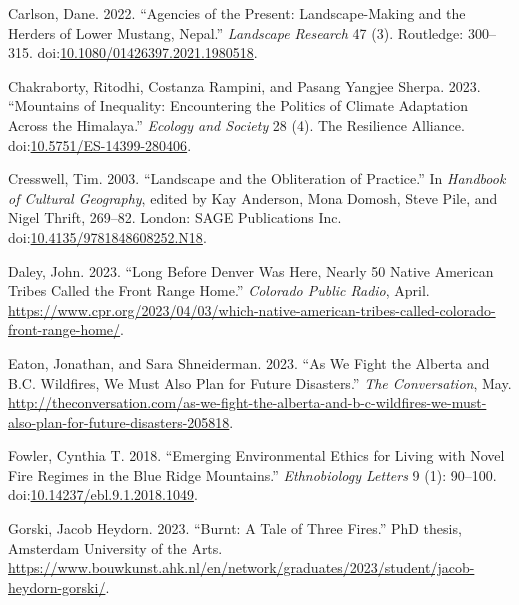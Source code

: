\documentclass[
]{article}
\newlength{\cslhangindent}
\newenvironment{CSLReferences}[2] %
 {\begin{list}{}{%
  \setlength{\itemindent}{0pt}
  \setlength{\leftmargin}{0pt}
  \setlength{\parsep}{0pt}
  \ifodd #1
   \setlength{\leftmargin}{\cslhangindent}
   \setlength{\itemindent}{-1\cslhangindent}
  \fi
  \setlength{\itemsep}{#2\baselineskip}}}
 {\end{list}}
\begin{document}
\begin{CSLReferences}{1}{0}
Carlson, Dane. 2022. {``Agencies of the Present: Landscape-Making and the Herders of Lower {Mustang}, {Nepal}.''} \emph{Landscape Research} 47 (3). Routledge: 300--315. doi:\href{https://doi.org/10.1080/01426397.2021.1980518}{10.1080/01426397.2021.1980518}.

Chakraborty, Ritodhi, Costanza Rampini, and Pasang Yangjee Sherpa. 2023. {``Mountains of Inequality: Encountering the Politics of Climate Adaptation Across the {Himalaya}.''} \emph{Ecology and Society} 28 (4). The Resilience Alliance. doi:\href{https://doi.org/10.5751/ES-14399-280406}{10.5751/ES-14399-280406}.

Cresswell, Tim. 2003. {``Landscape and the Obliteration of Practice.''} In \emph{Handbook of {Cultural Geography}}, edited by Kay Anderson, Mona Domosh, Steve Pile, and Nigel Thrift, 269--82. London: SAGE Publications Inc. doi:\href{https://doi.org/10.4135/9781848608252.N18}{10.4135/9781848608252.N18}.

Daley, John. 2023. {``Long Before {Denver} Was Here, Nearly 50 {Native American} Tribes Called the {Front Range} Home.''} \emph{Colorado Public Radio}, April. \url{https://www.cpr.org/2023/04/03/which-native-american-tribes-called-colorado-front-range-home/}.

Eaton, Jonathan, and Sara Shneiderman. 2023. {``As We Fight the {Alberta} and {B}.{C}. Wildfires, We Must Also Plan for Future Disasters.''} \emph{The Conversation}, May. \url{http://theconversation.com/as-we-fight-the-alberta-and-b-c-wildfires-we-must-also-plan-for-future-disasters-205818}.

Fowler, Cynthia T. 2018. {``Emerging {Environmental Ethics} for {Living} with {Novel Fire Regimes} in the {Blue Ridge Mountains}.''} \emph{Ethnobiology Letters} 9 (1): 90--100. doi:\href{https://doi.org/10.14237/ebl.9.1.2018.1049}{10.14237/ebl.9.1.2018.1049}.

Gorski, Jacob Heydorn. 2023. {``Burnt: {A Tale} of {Three Fires}.''} PhD thesis, Amsterdam University of the Arts. \url{https://www.bouwkunst.ahk.nl/en/network/graduates/2023/student/jacob-heydorn-gorski/}.


\end{CSLReferences}
\end{document}
